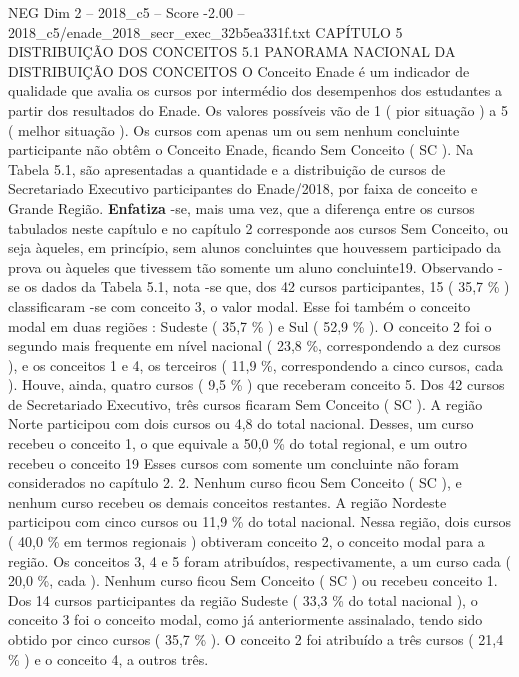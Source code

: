 \begin{textsample}{NEG Dim 2 – 2018\_c5 – Score -2.00 – 2018\_c5/enade\_2018\_secr\_exec\_32b5ea331f.txt}  \label{ex:f2_neg_117}
CAPÍTULO 5 DISTRIBUIÇÃO DOS CONCEITOS 5.1 PANORAMA NACIONAL DA DISTRIBUIÇÃO DOS CONCEITOS O Conceito Enade é um indicador de qualidade que avalia os cursos por intermédio dos desempenhos dos estudantes a partir dos resultados do Enade.
Os valores possíveis vão de 1 ( pior situação ) a 5 ( melhor situação ).
Os cursos com apenas um ou sem nenhum concluinte participante não obtêm o Conceito Enade, ficando Sem Conceito ( SC ).
Na Tabela 5.1, são apresentadas a quantidade e a distribuição de cursos de Secretariado Executivo participantes do Enade/2018, por faixa de conceito e Grande Região. \textbf{Enfatiza} -se, mais uma vez, que a diferença entre os cursos tabulados neste capítulo e no capítulo 2 corresponde aos cursos Sem Conceito, ou seja àqueles, em princípio, sem alunos concluintes que houvessem participado da prova ou àqueles que tivessem tão somente um aluno concluinte19.
Observando -se os dados da Tabela 5.1, nota -se que, dos 42 cursos participantes, 15 ( 35,7 \% ) classificaram -se com conceito 3, o valor modal.
Esse foi também o conceito modal em duas regiões : Sudeste ( 35,7 \% ) e Sul ( 52,9 \% ).
O conceito 2 foi o segundo mais frequente em nível nacional ( 23,8 \%, correspondendo a dez cursos ), e os conceitos 1 e 4, os terceiros ( 11,9 \%, correspondendo a cinco cursos, cada ).
Houve, ainda, quatro cursos ( 9,5 \% ) que receberam conceito 5.
Dos 42 cursos de Secretariado Executivo, três cursos ficaram Sem Conceito ( SC ).
A região Norte participou com dois cursos ou 4,8 do total nacional.
Desses, um curso recebeu o conceito 1, o que equivale a 50,0 \% do total regional, e um outro recebeu o conceito 19 Esses cursos com somente um concluinte não foram considerados no capítulo 2. 2.
Nenhum curso ficou Sem Conceito ( SC ), e nenhum curso recebeu os demais conceitos restantes.
A região Nordeste participou com cinco cursos ou 11,9 \% do total nacional.
Nessa região, dois cursos ( 40,0 \% em termos regionais ) obtiveram conceito 2, o conceito modal para a região.
Os conceitos 3, 4 e 5 foram atribuídos, respectivamente, a um curso cada ( 20,0 \%, cada ).
Nenhum curso ficou Sem Conceito ( SC ) ou recebeu conceito 1.
Dos 14 cursos participantes da região Sudeste ( 33,3 \% do total nacional ), o conceito 3 foi o conceito modal, como já anteriormente assinalado, tendo sido obtido por cinco cursos ( 35,7 \% ).
O conceito 2 foi atribuído a três cursos ( 21,4 \% ) e o conceito 4, a outros três.

\end{textsample}
